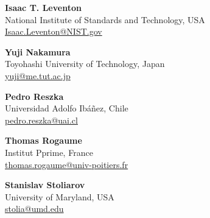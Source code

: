 \documentclass[12pt]{article}
\begin{document}
\textbf{Isaac T. Leventon}\\
     National Institute of Standards and Technology, USA\\
         \href{mailto:isaac.leventon@NIST.gov }{Isaac.Leventon@NIST.gov }
   \vspace{0.5cm}

\textbf{Yuji Nakamura} \\
    Toyohashi University of Technology, Japan\\
    \href{mailto:yuji@me.tut.ac.jp}{yuji@me.tut.ac.jp}
   \vspace{0.5cm}

\textbf{Pedro Reszka} \\
    Universidad Adolfo Ibáñez, Chile\\
    \href{mailto:pedro.reszka@uai.cl}{pedro.reszka@uai.cl}
   \vspace{0.5cm}

\textbf{Thomas Rogaume} \\
Institut Pprime, France\\
    \href{mailto:thomas.rogaume@univ-poitiers.fr}{thomas.rogaume@univ-poitiers.fr}

    \vspace{0.5cm}   

\textbf{Stanislav Stoliarov} \\
University of Maryland, USA\\
    \href{mailto:stolia@umd.edu}{stolia@umd.edu}
    \vspace{0.4cm}
    




\end{document}
